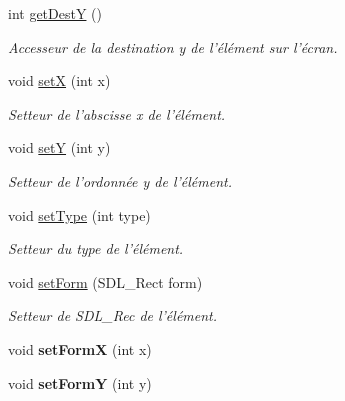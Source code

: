 \begin{DoxyCompactItemize}
int \hyperlink{classElementUI_a6e8c7e7467b8fafdd9e7c886b785ea51}{get\-Dest\-Y} ()
\begin{DoxyCompactList}\small\item\em Accesseur de la destination y de l'élément sur l'écran. \end{DoxyCompactList}\item 
void \hyperlink{classElementUI_afafbb62d1a13a9f56bf5f4ad78c20905}{set\-X} (int x)
\begin{DoxyCompactList}\small\item\em Setteur de l'abscisse x de l'élément. \end{DoxyCompactList}\item 
void \hyperlink{classElementUI_a13de120da5df1a81e0460fad5b88894e}{set\-Y} (int y)
\begin{DoxyCompactList}\small\item\em Setteur de l'ordonnée y de l'élément. \end{DoxyCompactList}\item 
void \hyperlink{classElementUI_a1c4fffc4b82d638e54af466149a6fd33}{set\-Type} (int type)
\begin{DoxyCompactList}\small\item\em Setteur du type de l'élément. \end{DoxyCompactList}\item 
void \hyperlink{classElementUI_a2cabdf9ffa98f640211dfdf42230d47e}{set\-Form} (S\-D\-L\-\_\-\-Rect form)
\begin{DoxyCompactList}\small\item\em Setteur de S\-D\-L\-\_\-\-Rec de l'élément. \end{DoxyCompactList}\item 
\hypertarget{classElementUI_a016963ca753305c277ce0d4f2aeaa2a2}{void {\bfseries set\-Form\-X} (int x)}\label{classElementUI_a016963ca753305c277ce0d4f2aeaa2a2}

\item 
\hypertarget{classElementUI_a151e22a2ac8858ad812da3bdd9ecefbc}{void {\bfseries set\-Form\-Y} (int y)}\label{classElementUI_a151e22a2ac8858ad812da3bdd9ecefbc}


\end{DoxyCompactItemize}
